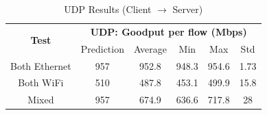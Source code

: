         \begin{table}[H]
            \small
            \centering
            \begin{tabular}{|ll|lllll|}
            \hline
            \multicolumn{2}{|c|}{\multirow{2}{*}{\textbf{Test}}} & 
                \multicolumn{5}{c|}{\textbf{UDP: Goodput per flow (Mbps)}} \\
            \cline{3-7}
            \multicolumn{2}{|c|}{} &
                \multicolumn{1}{c|}{Prediction} &
                \multicolumn{1}{c|}{Average} &
                \multicolumn{1}{c|}{Min} &
                \multicolumn{1}{c|}{Max} &
                \multicolumn{1}{c|}{Std} \\
            \hline
            \multicolumn{2}{|c|}{Both Ethernet} &
                \multicolumn{1}{c|}{957} &
                \multicolumn{1}{c|}{952.8} &
                \multicolumn{1}{c|}{948.3} &
                \multicolumn{1}{c|}{954.6} &
                \multicolumn{1}{c|}{1.73} \\
            \hline
            \multicolumn{2}{|c|}{Both WiFi} &
                \multicolumn{1}{c|}{510} &
                \multicolumn{1}{c|}{487.8} &
                \multicolumn{1}{c|}{453.1} &
                \multicolumn{1}{c|}{499.9} &
                \multicolumn{1}{c|}{15.8} \\
            \hline
            \multicolumn{2}{|c|}{Mixed} &
                \multicolumn{1}{c|}{957} &
                \multicolumn{1}{c|}{674.9} &
                \multicolumn{1}{c|}{636.6} &
                \multicolumn{1}{c|}{717.8} &
                \multicolumn{1}{c|}{28} \\
            \hline
            \end{tabular}
            \vspace{0.5cm}
            \caption{UDP Results (Client $\rightarrow$ Server)}
            \label{tab:udp-results}
        \end{table}

        \vspace{-0.3cm}

